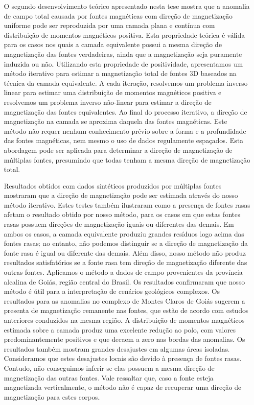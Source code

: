 O segundo desenvolvimento teórico apresentado nesta tese mostra que a anomalia de campo total causada por fontes magnéticas com direção 
de magnetização uniforme pode ser reproduzida por uma camada plana e contínua com distribuição de momentos magnéticos positiva. 
Esta propriedade teórica é válida para os casos nos quais a camada equivalente possui a mesma direção de magnetização 
das fontes verdadeiras, ainda que a magnetização seja puramente induzida ou não. 
Utilizando esta propriedade de positividade, apresentamos um método iterativo para estimar a magnetização total de fontes 
3D baseados na técnica da camada equivalente. A cada iteração, resolvemos um problema inverso linear para estimar uma distribuição 
de momentos magnéticos positiva e resolvemos um problema inverso não-linear para estimar a direção de magnetização das 
fontes equivalentes. Ao final do processo iterativo, a direção de magnetização na camada se aproxima daquela das 
fontes magnéticas. 
Este método não requer nenhum conhecimento prévio sobre a forma e a profundidade das fontes 
magnéticas, nem mesmo o uso de dados regulamente espaçados. Esta abordagem pode ser aplicada para determinar a direção 
de magnetização de múltiplas fontes, presumindo que todas tenham a mesma direção de magnetização total. 

Resultados obtidos com dados sintéticos produzidos por múltiplas fontes mostraram que a direção de magnetização 
pode ser estimada através do nosso método iterativo. 
Estes testes também ilustraram como a presença de fontes rasas afetam 
o resultado obtido por nosso método, para os casos em que estas fontes rasas possuem direções de magnetização iguais ou 
diferentes das demais. 
Em ambos os casos, a camada equivalente produziu grandes resíduos logo acima das fontes rasas; no entanto, não podemos 
distinguir se a direção de magnetização da fonte rasa é igual ou diferente das demais. 
Além disso, nosso método não produz resultados satisfatórios se a fonte rasa tem direção de magnetização diferente das outras fontes. 
Aplicamos o método a dados de campo provenientes da província alcalina de Goiás, região central do Brasil. 
Os resultados confirmaram que nosso método é útil para a interpretação de cenários geológicos complexos. 
Os resultados para as anomalias no complexo de Montes Claros de Goiás sugerem a presenta de magnetização remanente nas fontes, 
que estão de acordo com estudos anteriores conduzidos na mesma região. 
A distribuição de momentos magnéticos estimada sobre a camada produz uma excelente redução ao polo, com valores predominantemente positivos
e que decaem a zero nas bordas das anomalias. 
Os resultados também mostram grandes desajustes em algumas áreas isoladas. 
Consideramos que estes desajustes locais são devido à presença de fontes rasas. Contudo, não conseguimos inferir se elas possuem a 
mesma direção de magnetização das outras fontes. 
Vale ressaltar que, caso a fonte esteja magnetizada verticalmente, o método não é capaz de recuperar 
uma direção de magnetização para estes corpos.  


